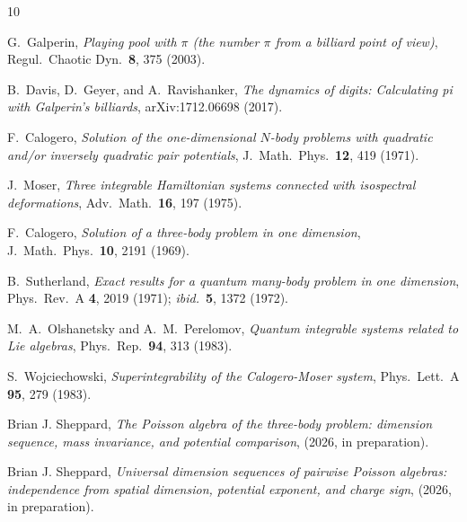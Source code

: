 \documentclass[aps,prl,twocolumn,superscriptaddress,showpacs]{revtex4-2}
\begin{document}
\begin{thebibliography}{10}

G.~Galperin,
\textit{Playing pool with $\pi$ (the number $\pi$ from a billiard
point of view)},
Regul.\ Chaotic Dyn.\ \textbf{8}, 375 (2003).

B.~Davis, D.~Geyer, and A.~Ravishanker,
\textit{The dynamics of digits: Calculating pi with Galperin's
billiards},
arXiv:1712.06698 (2017).

F.~Calogero,
\textit{Solution of the one-dimensional $N$-body problems with
quadratic and/or inversely quadratic pair potentials},
J.\ Math.\ Phys.\ \textbf{12}, 419 (1971).

J.~Moser,
\textit{Three integrable Hamiltonian systems connected with isospectral
deformations},
Adv.\ Math.\ \textbf{16}, 197 (1975).

F.~Calogero,
\textit{Solution of a three-body problem in one dimension},
J.\ Math.\ Phys.\ \textbf{10}, 2191 (1969).

B.~Sutherland,
\textit{Exact results for a quantum many-body problem in one
dimension},
Phys.\ Rev.\ A \textbf{4}, 2019 (1971);
\textit{ibid.}\ \textbf{5}, 1372 (1972).

M.~A.~Olshanetsky and A.~M.~Perelomov,
\textit{Quantum integrable systems related to Lie algebras},
Phys.\ Rep.\ \textbf{94}, 313 (1983).

S.~Wojciechowski,
\textit{Superintegrability of the Calogero-Moser system},
Phys.\ Lett.\ A \textbf{95}, 279 (1983).

Brian J. Sheppard,
\textit{The Poisson algebra of the three-body problem:
dimension sequence, mass invariance, and potential comparison},
(2026, in preparation).

Brian J. Sheppard,
\textit{Universal dimension sequences of pairwise Poisson algebras:
independence from spatial dimension, potential exponent, and charge
sign},
(2026, in preparation).

\end{thebibliography}
\end{document}
